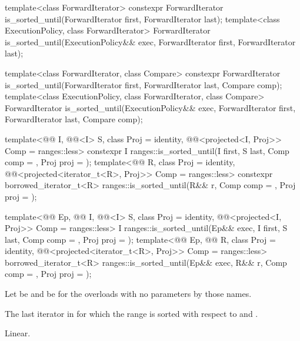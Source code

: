 %
\begin{itemdecl}
template<class ForwardIterator>
  constexpr ForwardIterator
    is_sorted_until(ForwardIterator first, ForwardIterator last);
template<class ExecutionPolicy, class ForwardIterator>
  ForwardIterator
    is_sorted_until(ExecutionPolicy&& exec,
                    ForwardIterator first, ForwardIterator last);

template<class ForwardIterator, class Compare>
  constexpr ForwardIterator
    is_sorted_until(ForwardIterator first, ForwardIterator last,
                    Compare comp);
template<class ExecutionPolicy, class ForwardIterator, class Compare>
  ForwardIterator
    is_sorted_until(ExecutionPolicy&& exec,
                    ForwardIterator first, ForwardIterator last,
                    Compare comp);

template<@@ I, @@<I> S, class Proj = identity,
         @@<projected<I, Proj>> Comp = ranges::less>
  constexpr I ranges::is_sorted_until(I first, S last, Comp comp = {}, Proj proj = {});
template<@@ R, class Proj = identity,
         @@<projected<iterator_t<R>, Proj>> Comp = ranges::less>
  constexpr borrowed_iterator_t<R>
    ranges::is_sorted_until(R&& r, Comp comp = {}, Proj proj = {});

template<@@ Ep, @@ I, @@<I> S,
         class Proj = identity,
         @@<projected<I, Proj>> Comp = ranges::less>
  I ranges::is_sorted_until(Ep&& exec, I first, S last, Comp comp = {},
                            Proj proj = {});
template<@@ Ep, @@ R, class Proj = identity,
         @@<projected<iterator_t<R>, Proj>> Comp = ranges::less>
  borrowed_iterator_t<R>
    ranges::is_sorted_until(Ep&& exec, R&& r, Comp comp = {}, Proj proj = {});
\end{itemdecl}

\begin{itemdescr}
\pnum
Let  be 
and  be 
for the overloads with no parameters by those names.

\pnum
\returns
The last iterator  in 
for which the range 
is sorted with respect to  and .

\pnum
\complexity
Linear.
\end{itemdescr}

